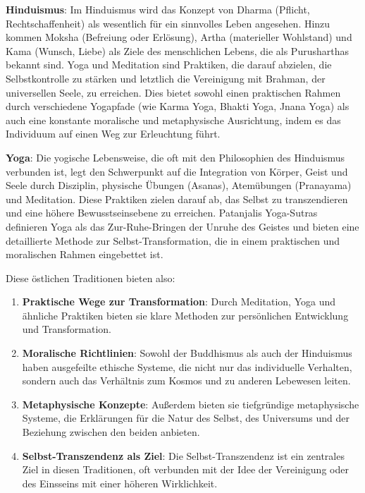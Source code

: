 \documentclass[12pt,a4paper]{article}
\begin{document}
\textbf{Hinduismus}:
Im Hinduismus wird das Konzept von Dharma (Pflicht, Rechtschaffenheit) als wesentlich für ein sinnvolles Leben angesehen. Hinzu kommen Moksha (Befreiung oder Erlösung), Artha (materieller Wohlstand) und Kama (Wunsch, Liebe) als Ziele des menschlichen Lebens, die als Purusharthas bekannt sind. Yoga und Meditation sind Praktiken, die darauf abzielen, die Selbstkontrolle zu stärken und letztlich die Vereinigung mit Brahman, der universellen Seele, zu erreichen. Dies bietet sowohl einen praktischen Rahmen durch verschiedene Yogapfade (wie Karma Yoga, Bhakti Yoga, Jnana Yoga) als auch eine konstante moralische und metaphysische Ausrichtung, indem es das Individuum auf einen Weg zur Erleuchtung führt.

\textbf{Yoga}:
Die yogische Lebensweise, die oft mit den Philosophien des Hinduismus verbunden ist, legt den Schwerpunkt auf die Integration von Körper, Geist und Seele durch Disziplin, physische Übungen (Asanas), Atemübungen (Pranayama) und Meditation. Diese Praktiken zielen darauf ab, das Selbst zu transzendieren und eine höhere Bewusstseinsebene zu erreichen. Patanjalis Yoga-Sutras definieren Yoga als das Zur-Ruhe-Bringen der Unruhe des Geistes und bieten eine detaillierte Methode zur Selbst-Transformation, die in einem praktischen und moralischen Rahmen eingebettet ist.

Diese östlichen Traditionen bieten also:

\begin{enumerate}
    \item
\textbf{Praktische Wege zur Transformation}: Durch Meditation, Yoga und ähnliche Praktiken bieten sie klare Methoden zur persönlichen Entwicklung und Transformation.

\item
\textbf{Moralische Richtlinien}: Sowohl der Buddhismus als auch der Hinduismus haben ausgefeilte ethische Systeme, die nicht nur das individuelle Verhalten, sondern auch das Verhältnis zum Kosmos und zu anderen Lebewesen leiten.

\item
\textbf{Metaphysische Konzepte}: Außerdem bieten sie tiefgründige metaphysische Systeme, die Erklärungen für die Natur des Selbst, des Universums und der Beziehung zwischen den beiden anbieten.

\item
\textbf{Selbst-Transzendenz als Ziel}: Die Selbst-Transzendenz ist ein zentrales Ziel in diesen Traditionen, oft verbunden mit der Idee der Vereinigung oder des Einsseins mit einer höheren Wirklichkeit.
\end{enumerate}
\end{document}
